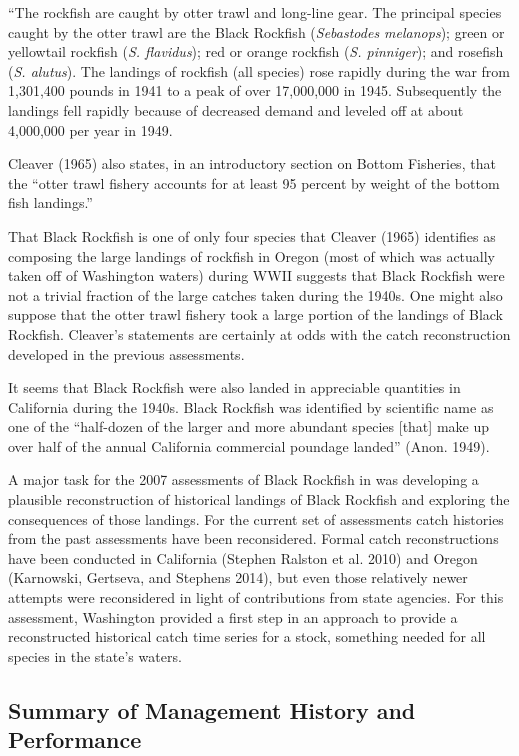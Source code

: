 \documentclass[11pt,
  english,
  letterpaper,
]{article}
\begin{document}
``The rockfish are caught by otter trawl and long-line gear. The principal species caught by the otter trawl are the Black Rockfish (\emph{Sebastodes melanops}); green or yellowtail rockfish (\emph{S. flavidus}); red or orange rockfish (\emph{S. pinniger}); and rosefish (\emph{S. alutus}). The landings of rockfish (all species) rose rapidly during the war from 1,301,400 pounds in 1941 to a peak of over 17,000,000 in 1945. Subsequently the landings fell rapidly because of decreased demand and leveled off at about 4,000,000 per year in 1949.

Cleaver (1965) also states, in an introductory section on Bottom Fisheries, that the ``otter trawl fishery accounts for at least 95 percent by weight of the bottom fish landings.''

That Black Rockfish is one of only four species that Cleaver (1965) identifies as composing the large landings of rockfish in Oregon (most of which was actually taken off of Washington waters) during WWII suggests that Black Rockfish were not a trivial fraction of the large catches taken during the 1940s. One might also suppose that the otter trawl fishery took a large portion of the landings of Black Rockfish. Cleaver's statements are certainly at odds with the catch reconstruction developed in the previous assessments.

It seems that Black Rockfish were also landed in appreciable quantities in California during the 1940s. Black Rockfish was identified by scientific name as one of the ``half-dozen of the larger and more abundant species {[}that{]} make up over half of the annual California commercial poundage landed'' (Anon. 1949).

A major task for the 2007 assessments of Black Rockfish in was developing a plausible reconstruction of historical landings of Black Rockfish and exploring the consequences of those landings. For the current set of assessments catch histories from the past assessments have been reconsidered. Formal catch reconstructions have been conducted in California (Stephen Ralston et al. 2010) and Oregon (Karnowski, Gertseva, and Stephens 2014), but even those relatively newer attempts were reconsidered in light of contributions from state agencies. For this assessment, Washington provided a first step in an approach to provide a reconstructed historical catch time series for a stock, something needed for all species in the state's waters.

\hypertarget{summary-of-management-history-and-performance}{%
\subsection{Summary of Management History and Performance}\label{summary-of-management-history-and-performance}}
\end{document}
